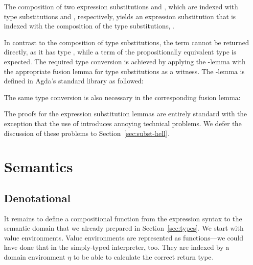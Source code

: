 \documentclass[acmsmall,anonymous,review,screen]{acmart}
\begin{document}


The composition of two expression substitutions  and , which
are indexed with type substitutions  and
, respectively, yields an expression substitution that
is indexed with the composition of the type substitutions,
.
\SubstExamplesECompSS

In contrast to the composition of type substitutions, the term
 cannot be returned directly,
as it has type ,
while a term of the propositionally equivalent type
 is expected.
The required type conversion is achieved by applying the
{\Asubst}-lemma with the appropriate fusion lemma for type
substitutions as a witness. 
The {\Asubst}-lemma is defined in Agda's standard library as
followed:
\SubstExamplesDef

The same type conversion is also necessary in the corresponding fusion lemma:
\SubstExamplesFusionESubESub

The proofs for the expression substitution lemmas are entirely standard with the
exception that the use of {\Asubst} introduces annoying technical problems.
We defer the discussion of these problems to Section~\ref{sec:subst-hell}.


\section{Semantics}
\label{sec:semantics}

\subsection{Denotational}
\label{sec:denotational}



It remains to define a compositional function from the expression
syntax to the semantic domain that we already prepared in
Section~\ref{sec:types}. We start with value environments.
\TFVEnv
Value environments are represented as functions---we could have done
that in the simply-typed interpreter, too. They are indexed by a
domain environment $\eta$ to be able to calculate the correct return type.
\end{document}
